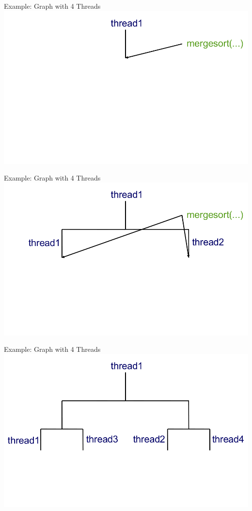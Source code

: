 \begin{frame}{Example: Graph with 4 Threads}
  \includegraphics[width=\textwidth]{figures/thread-1}
\end{frame}

\begin{frame}{Example: Graph with 4 Threads}
  \includegraphics[width=\textwidth]{figures/thread-2}
\end{frame}

\begin{frame}{Example: Graph with 4 Threads}
  \includegraphics[width=\textwidth]{figures/thread-3}
\end{frame}

